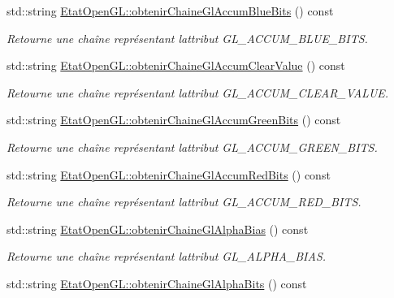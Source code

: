 \begin{DoxyCompactItemize}
std\+::string \hyperlink{group__utilitaire_ga695387ee2d838c97214c70219d52da10}{Etat\+Open\+G\+L\+::obtenir\+Chaine\+Gl\+Accum\+Blue\+Bits} () const 
\begin{DoxyCompactList}\small\item\em Retourne une chaîne représentant l\textquotesingle{}attribut G\+L\+\_\+\+A\+C\+C\+U\+M\+\_\+\+B\+L\+U\+E\+\_\+\+B\+I\+T\+S. \end{DoxyCompactList}\item 
std\+::string \hyperlink{group__utilitaire_gaf3e85f5f434e93aa09376200f3c837ae}{Etat\+Open\+G\+L\+::obtenir\+Chaine\+Gl\+Accum\+Clear\+Value} () const 
\begin{DoxyCompactList}\small\item\em Retourne une chaîne représentant l\textquotesingle{}attribut G\+L\+\_\+\+A\+C\+C\+U\+M\+\_\+\+C\+L\+E\+A\+R\+\_\+\+V\+A\+L\+U\+E. \end{DoxyCompactList}\item 
std\+::string \hyperlink{group__utilitaire_gae677b60d2113b1843ba4d2c92fe34c34}{Etat\+Open\+G\+L\+::obtenir\+Chaine\+Gl\+Accum\+Green\+Bits} () const 
\begin{DoxyCompactList}\small\item\em Retourne une chaîne représentant l\textquotesingle{}attribut G\+L\+\_\+\+A\+C\+C\+U\+M\+\_\+\+G\+R\+E\+E\+N\+\_\+\+B\+I\+T\+S. \end{DoxyCompactList}\item 
std\+::string \hyperlink{group__utilitaire_ga3405a98de14c30d7a57d954d298b6376}{Etat\+Open\+G\+L\+::obtenir\+Chaine\+Gl\+Accum\+Red\+Bits} () const 
\begin{DoxyCompactList}\small\item\em Retourne une chaîne représentant l\textquotesingle{}attribut G\+L\+\_\+\+A\+C\+C\+U\+M\+\_\+\+R\+E\+D\+\_\+\+B\+I\+T\+S. \end{DoxyCompactList}\item 
std\+::string \hyperlink{group__utilitaire_gaf54d9525863334d2d2fd362c7043a4be}{Etat\+Open\+G\+L\+::obtenir\+Chaine\+Gl\+Alpha\+Bias} () const 
\begin{DoxyCompactList}\small\item\em Retourne une chaîne représentant l\textquotesingle{}attribut G\+L\+\_\+\+A\+L\+P\+H\+A\+\_\+\+B\+I\+A\+S. \end{DoxyCompactList}\item 
std\+::string \hyperlink{group__utilitaire_ga7ea311e8cfd6aee3cb19e2041b2ba132}{Etat\+Open\+G\+L\+::obtenir\+Chaine\+Gl\+Alpha\+Bits} () const 

\end{DoxyCompactItemize}
